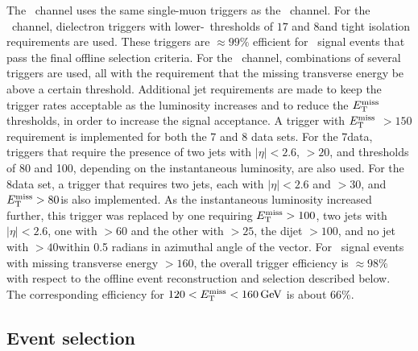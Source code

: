 \documentclass[11pt,twoside,a4paper,cmspaper,final,collab]{cms-tdr}
\begin{document}
The \ZmmH\ channel uses the same single-muon triggers as the \WmnH\ channel.
For the \ZeeH\ channel, dielectron triggers with lower-\PT\
thresholds of $17$ and $8$\GeV  and tight isolation requirements are used.
These triggers are $\approx 99\%$ efficient for  \ZH\  signal events that pass the
final offline selection criteria.  For the \ZnnH\ channel, combinations of several triggers are
used, all with the requirement that the missing transverse energy be
above a certain threshold. Additional jet requirements are made to
keep the trigger rates acceptable as the luminosity increases and to reduce
the $E_{\mathrm{T}}^{\text{miss}}$ thresholds, in order to increase the signal
acceptance.
A trigger with $E_{\mathrm{T}}^{\text{miss}}$ $>150$\GeV requirement  is
implemented for both the 7 and 8\TeV
data sets. For the 7\TeV data, triggers that require the
presence of two jets with $|\eta|<2.6$,  \PT $>20$\GeV, and
\MET thresholds
of 80 and 100\GeV, depending on the instantaneous luminosity, are also used.
For the 8\TeV data set, a trigger that requires two jets,
each with $|\eta| < 2.6$ and \PT $> 30$\GeV, and $E_{\mathrm{T}}^{\text{miss}} > 80$\GeV is
also implemented.  As the instantaneous luminosity
increased further, this trigger was replaced by one
requiring $E_{\mathrm{T}}^{\text{miss}} > 100$\GeV, two jets with $|\eta| < 2.6$, one with \PT $>60$\GeV
and the other with \PT $> 25$\GeV, the dijet \PT $> 100$\GeV,
and no jet with \PT $> 40$\GeV within 0.5 radians in azimuthal angle of the \ETmiss vector.
For \ZnnH\ signal events with
missing transverse energy $>160$\GeV, the overall
trigger efficiency is $\approx 98\%$ with
respect to the offline event reconstruction and selection described
below. The corresponding efficiency for $120< E_{\mathrm{T}}^{\text{miss}} < 160\,\text{Ge\hspace{-.08em}V}$ is about 66\%.






\subsection{Event selection}\label{sssec:hbb_Event_Selection}
\end{document}
